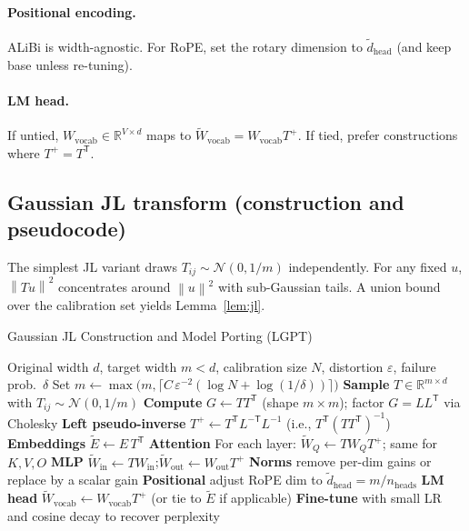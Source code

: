 \documentclass{article}
\newcommand{\R}{\mathbb{R}}
\newcommand{\norm}[1]{\left\lVert #1 \right\rVert}
\newcommand{\Trans}{\mathsf{T}}
\begin{document}
\paragraph{Positional encoding.}
ALiBi is width-agnostic. For RoPE, set the rotary dimension to $\tilde{d}_\text{head}$
(and keep base unless re-tuning).

\paragraph{LM head.}
If untied, $W_\text{vocab}\in\R^{V\times d}$ maps to $\tilde{W}_\text{vocab}=W_\text{vocab}T^+$.
If tied, prefer constructions where $T^+=T^\Trans$.

\subsection{Gaussian JL transform (construction and pseudocode)}
The simplest JL variant draws $T_{ij}\sim\mathcal{N}(0,1/m)$ independently.
For any fixed $u$, $\norm{Tu}^2$ concentrates around $\norm{u}^2$ with sub-Gaussian
tails. A union bound over the calibration set yields Lemma~\ref{lem:jl}.

\begin{algorithm}[H]
\caption{Gaussian JL Construction and Model Porting (LGPT)}
\label{alg:gaussian-jl}
\begin{algorithmic}[1]
\REQUIRE Original width $d$, target width $m<d$, calibration size $N$, distortion $\varepsilon$, failure prob.\ $\delta$
\STATE Set $m\leftarrow \max\bigl(m, \lceil C\,\varepsilon^{-2}(\log N+\log(1/\delta))\rceil\bigr)$
\STATE \textbf{Sample} $T\in\R^{m\times d}$ with $T_{ij}\sim\mathcal{N}(0,1/m)$
\STATE \textbf{Compute} $G\leftarrow TT^\Trans$ (shape $m\times m$); factor $G=LL^\Trans$ via Cholesky
\STATE \textbf{Left pseudo-inverse} $T^+ \leftarrow T^\Trans L^{-\Trans} L^{-1}$ \hfill (i.e., $T^\Trans (TT^\Trans)^{-1}$)
\STATE \textbf{Embeddings} $\tilde{E}\leftarrow E\,T^\Trans$
\STATE \textbf{Attention} For each layer: $\tilde{W}_Q\leftarrow T W_Q T^+$; same for $K,V,O$
\STATE \textbf{MLP} $\tilde{W}_\text{in}\leftarrow T W_\text{in}$;\quad $\tilde{W}_\text{out}\leftarrow W_\text{out}T^+$
\STATE \textbf{Norms} remove per-dim gains or replace by a scalar gain
\STATE \textbf{Positional} adjust RoPE dim to $\tilde{d}_\text{head}=m/n_\text{heads}$
\STATE \textbf{LM head} $\tilde{W}_\text{vocab}\leftarrow W_\text{vocab}T^+$ (or tie to $\tilde{E}$ if applicable)
\STATE \textbf{Fine-tune} with small LR and cosine decay to recover perplexity
\end{algorithmic}
\end{algorithm}
\end{document}
